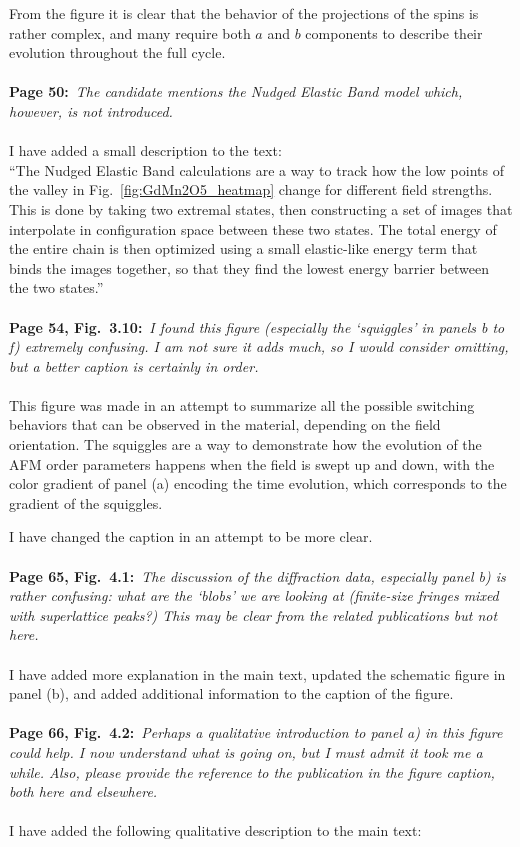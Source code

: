 \documentclass[a4, UTF8]{article}
\begin{document}
From the figure it is clear that the behavior of the projections of the spins is rather complex, and many require both $a$ and $b$ components to describe their evolution throughout the full cycle.
\\\\
{\bf Page 50:}~{\it The candidate mentions the Nudged Elastic Band model which, however, is not introduced.}
\\\\
I have added a small description to the text:\\
``The Nudged Elastic Band calculations are a way to track how the low points of the valley in Fig.~\ref{fig:GdMn2O5_heatmap} change for different field strengths.
This is done by taking two extremal states, then constructing a set of images that interpolate in configuration space between these two states. The total energy of the entire chain is then optimized using a small elastic-like energy term that binds the images together, so that they find the lowest energy barrier between the two states.''
\\\\
{\bf Page 54, Fig.~3.10:}~{\it I found this figure (especially the `squiggles' in panels b to f) extremely confusing. I am not sure it adds much, so I would consider omitting, but a better caption is certainly in order.}
\\\\
This figure was made in an attempt to summarize all the possible switching behaviors that can be observed in the material, depending on the field orientation. The squiggles are a way to demonstrate how the evolution of the AFM order parameters happens when the field is swept up and down, with the color gradient of panel (a) encoding the time evolution, which corresponds to the gradient of the squiggles.

I have changed the caption in an attempt to be more clear.
\\\\
{\bf Page 65, Fig.~4.1:}~{\it The discussion of the diffraction data, especially panel b) is rather confusing:
what are the ‘blobs’ we are looking at (finite-size fringes mixed with superlattice peaks?) This may
be clear from the related publications but not here.}
\\\\
I have added more explanation in the main text, updated the schematic figure in panel (b), and added additional information to the caption of the figure.
\\\\
{\bf Page 66, Fig.~4.2:}~{\it Perhaps a qualitative introduction to panel a) in this figure could help. I now understand what is going on, but I must admit it took me a while. Also, please provide the
reference to the publication in the figure caption, both here and elsewhere.}
\\\\
I have added the following qualitative description to the main text:
\end{document}
